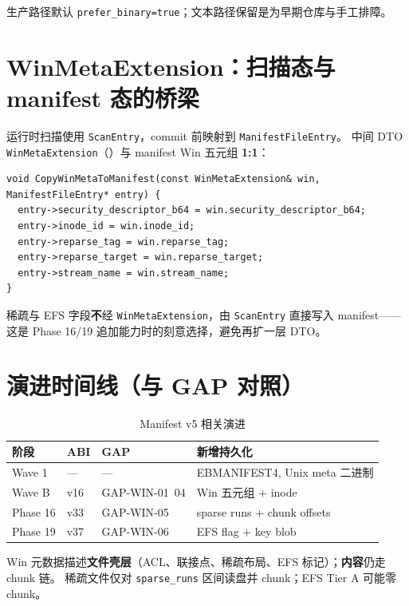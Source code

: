 生产路径默认 \texttt{prefer\_binary=true}；文本路径保留是为早期仓库与手工排障。

\section{WinMetaExtension：扫描态与 manifest 态的桥梁}

运行时扫描使用 \texttt{ScanEntry}，commit 前映射到 \texttt{ManifestFileEntry}。
中间 DTO \texttt{WinMetaExtension}（）与 manifest Win 五元组 \textbf{1:1}：

\begin{lstlisting}[caption={CopyWinMetaToManifest (win\_meta.cc)}]
void CopyWinMetaToManifest(const WinMetaExtension& win, ManifestFileEntry* entry) {
  entry->security_descriptor_b64 = win.security_descriptor_b64;
  entry->inode_id = win.inode_id;
  entry->reparse_tag = win.reparse_tag;
  entry->reparse_target = win.reparse_target;
  entry->stream_name = win.stream_name;
}
\end{lstlisting}

稀疏与 EFS 字段\textbf{不}经 \texttt{WinMetaExtension}，由 \texttt{ScanEntry} 直接写入 manifest——这是 Phase 16/19 追加能力时的刻意选择，避免再扩一层 DTO。

\section{演进时间线（与 GAP 对照）}

\begin{longtable}{@{}lllp{5.5cm}@{}}
\caption{Manifest v5 相关演进} \\
\toprule
阶段 & ABI & GAP & 新增持久化 \\
\midrule
Wave 1 & — & — & EBMANIFEST4, Unix meta 二进制 \\
Wave B & v16 & GAP-WIN-01~04 & Win 五元组 + inode \\
Phase 16 & v33 & GAP-WIN-05 & sparse runs + chunk offsets \\
Phase 19 & v37 & GAP-WIN-06 & EFS flag + key blob \\
\bottomrule
\end{longtable}

\begin{warnbox}
Win 元数据描述\textbf{文件壳层}（ACL、联接点、稀疏布局、EFS 标记）；\textbf{内容}仍走 chunk 链。
稀疏文件仅对 \texttt{sparse\_runs} 区间读盘并 chunk；EFS Tier A 可能零 chunk。
\end{warnbox}

